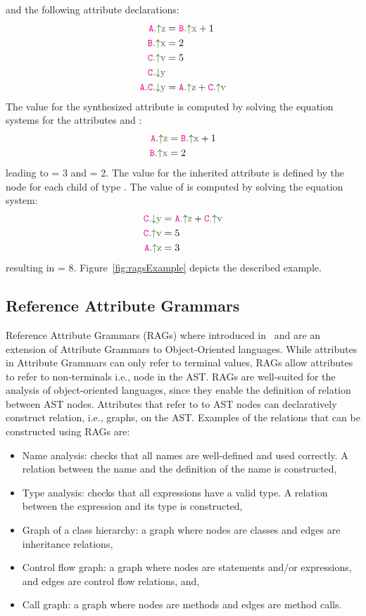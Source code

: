 and the following attribute declarations:
    \begin{align*}
        \Asyn{A}{z}& = \Asyn{B}{x} + 1 \\
        \Asyn{B}{x}& = 2 \\
        \Asyn{C}{v}& = 5 \\
        \Ainh{C}{y}& \\
        \Ainhdef{A}{C}{y}& = \Asyn{A}{z} + \Asyn{C}{v} \\
    \end{align*}
The value for the synthesized attribute  is computed by solving 
the equation systems for the attributes  and :
\begin{align*}
    \Asyn{A}{z} &= \Asyn{B}{x} + 1 \\
    \Asyn{B}{x} &= 2
\end{align*}
leading to  = 3 and  = 2.
The value for the inherited attribute  is defined by the node  for
each child of type . The value of  is computed by solving the equation system:
\begin{align*}
    \Ainh{C}{y} &= \Asyn{A}{z} + \Asyn{C}{v} \\
    \Asyn{C}{v} &= 5\\
    \Asyn{A}{z} &= 3
\end{align*}
resulting in  = 8. Figure~\ref{fig:ragsExample} depicts the described example.


\subsection{Reference Attribute Grammars}
\label{sec:rag}
Reference Attribute Grammars (RAGs) where introduced in~\cite{DBLP:journals/informaticaSI/Hedin00}
and are an extension of Attribute Grammars to Object-Oriented languages. While attributes in Attribute Grammars
can only refer to terminal values, RAGs allow attributes to refer to non-terminals i.e., node in the AST.
RAGs are well-suited for the analysis of object-oriented languages, since they enable 
the definition of relation between AST nodes. Attributes that refer to 
to AST nodes can declaratively construct relation, i.e., graphs, on the AST.
Examples of the relations that can be constructed using RAGs are:
\begin{itemize}
    \item Name analysis: checks that all names are well-defined and used correctly. A relation between 
    the name and the definition of the name is constructed,
    \item Type analysis: checks that all expressions have a valid type. A relation between the expression
    and its type is constructed,
    \item Graph of a class hierarchy: a graph where nodes are classes and edges are inheritance relations,
    \item Control flow graph: a graph where nodes are statements and/or expressions, and edges are control flow relations, and,
    \item Call graph: a graph where nodes are methods and edges are method calls.
\end{itemize}

